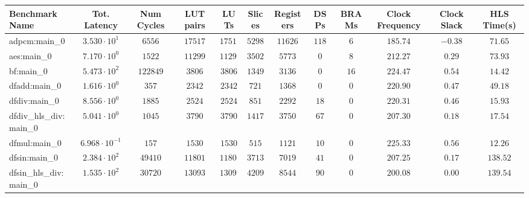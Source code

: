 \begin{tabular}{|l|c|c|c|c|c|c|c|c|c|c|c|}
\hline
Benchmark Name          & Tot. Latency            & Num Cycles & LUT pairs  & LUTs       & Slices    & Registers & DSPs    & BRAMs   & Clock Frequency & Clock Slack & HLS Time(s) \\
\hline
adpcm:main\_0           & $ 3.530 \cdot 10^{1}  $ & $ 6556   $ & $ 17517  $ & $ 17517  $ & $ 5298  $ & $ 11626 $ & $ 118 $ & $ 6   $ & $ 185.74      $ & $ -0.38   $ & $ 71.65   $ \\
aes:main\_0             & $ 7.170 \cdot 10^{0}  $ & $ 1522   $ & $ 11299  $ & $ 11299  $ & $ 3502  $ & $ 5773  $ & $ 0   $ & $ 8   $ & $ 212.27      $ & $ 0.29    $ & $ 73.93   $ \\
bf:main\_0              & $ 5.473 \cdot 10^{2}  $ & $ 122849 $ & $ 3806   $ & $ 3806   $ & $ 1349  $ & $ 3136  $ & $ 0   $ & $ 16  $ & $ 224.47      $ & $ 0.54    $ & $ 14.42   $ \\
dfadd:main\_0           & $ 1.616 \cdot 10^{0}  $ & $ 357    $ & $ 2342   $ & $ 2342   $ & $ 721   $ & $ 1368  $ & $ 0   $ & $ 0   $ & $ 220.90      $ & $ 0.47    $ & $ 49.18   $ \\
dfdiv:main\_0           & $ 8.556 \cdot 10^{0}  $ & $ 1885   $ & $ 2524   $ & $ 2524   $ & $ 851   $ & $ 2292  $ & $ 18  $ & $ 0   $ & $ 220.31      $ & $ 0.46    $ & $ 15.93   $ \\
dfdiv\_hls\_div:main\_0 & $ 5.041 \cdot 10^{0}  $ & $ 1045   $ & $ 3790   $ & $ 3790   $ & $ 1417  $ & $ 3750  $ & $ 67  $ & $ 0   $ & $ 207.30      $ & $ 0.18    $ & $ 17.54   $ \\
dfmul:main\_0           & $ 6.968 \cdot 10^{-1} $ & $ 157    $ & $ 1530   $ & $ 1530   $ & $ 515   $ & $ 1121  $ & $ 10  $ & $ 0   $ & $ 225.33      $ & $ 0.56    $ & $ 12.26   $ \\
dfsin:main\_0           & $ 2.384 \cdot 10^{2}  $ & $ 49410  $ & $ 11801  $ & $ 11801  $ & $ 3713  $ & $ 7019  $ & $ 41  $ & $ 0   $ & $ 207.25      $ & $ 0.17    $ & $ 138.52  $ \\
dfsin\_hls\_div:main\_0 & $ 1.535 \cdot 10^{2}  $ & $ 30720  $ & $ 13093  $ & $ 13093  $ & $ 4209  $ & $ 8544  $ & $ 90  $ & $ 0   $ & $ 200.08      $ & $ 0.00    $ & $ 139.54  $ \\

\end{tabular}
